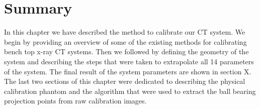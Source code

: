 \section{Summary}
In this chapter we have described the method to calibrate our CT system.  We begin by providing an overview of some of the existing methods for calibrating bench top x-ray CT systems.  Then we followed by defining the geometry of the system and describing the steps that were taken to extrapolate all 14 parameters of the system.  The final result of the system parameters are shown in section X.  The last two sections of this chapter were dedicated to describing the physical calibration phantom and the algorithm that were used to extract the ball bearing projection points from raw calibration images.  

%
%

